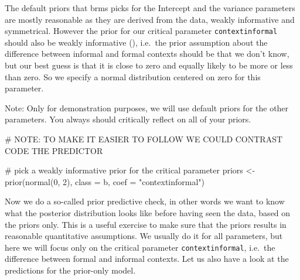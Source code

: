 \documentclass[
  doc,
  longtable,
  nolmodern,
  notxfonts,
  notimes,
  colorlinks=true,linkcolor=blue,citecolor=blue,urlcolor=blue]{apa7}
\newenvironment{Shaded}{\begin{snugshade}}{\end{snugshade}}
\newcommand{\AlertTok}[1]{\textcolor[rgb]{0.68,0.00,0.00}{#1}}
\newcommand{\AttributeTok}[1]{\textcolor[rgb]{0.40,0.45,0.13}{#1}}
\newcommand{\CommentTok}[1]{\textcolor[rgb]{0.37,0.37,0.37}{#1}}
\newcommand{\DecValTok}[1]{\textcolor[rgb]{0.68,0.00,0.00}{#1}}
\newcommand{\FunctionTok}[1]{\textcolor[rgb]{0.28,0.35,0.67}{#1}}
\newcommand{\NormalTok}[1]{\textcolor[rgb]{0.00,0.23,0.31}{#1}}
\newcommand{\OtherTok}[1]{\textcolor[rgb]{0.00,0.23,0.31}{#1}}
\newcommand{\StringTok}[1]{\textcolor[rgb]{0.13,0.47,0.30}{#1}}
\begin{document}
The default priors that brms picks for the Intercept and the variance
parameters are mostly reasonable as they are derived from the data,
weakly informative and symmetrical. However the prior for our critical
parameter \texttt{contextinformal} should also be weakly informative
(), i.e.~the prior assumption about the difference between informal
and formal contexts should be that we don't know, but our best guess is
that it is close to zero and equally likely to be more or less than
zero. So we specify a normal distribution centered on zero for this
parameter.

Note: Only for demonstration purposes, we will use default priors for
the other parameters. You always should critically reflect on all of
your priors.

\begin{Shaded}
\begin{Highlighting}[]
\CommentTok{\# }\AlertTok{NOTE}\CommentTok{: TO MAKE IT EASIER TO FOLLOW WE COULD CONTRAST CODE THE PREDICTOR}

\CommentTok{\# pick a weakly informative prior for the critical parameter}
\NormalTok{priors }\OtherTok{\textless{}{-}} \FunctionTok{prior}\NormalTok{(}\FunctionTok{normal}\NormalTok{(}\DecValTok{0}\NormalTok{, }\DecValTok{2}\NormalTok{), }
                \AttributeTok{class =}\NormalTok{ b, }
                \AttributeTok{coef =} \StringTok{"contextinformal"}\NormalTok{)}
\end{Highlighting}
\end{Shaded}

Now we do a so-called prior predictive check, in other words we want to
know what the posterior distribution looks like before having seen the
data, based on the priors only. This is a useful exercise to make sure
that the priors results in reasonable quantitative assumptions. We
usually do it for all parameters, but here we will focus only on the
critical parameter \texttt{contextinformal}, i.e.~the difference between
formal and informal contexts. Let us also have a look at the predictions
for the prior-only model.
\end{document}

